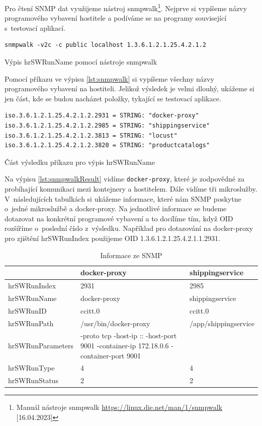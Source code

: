 Pro čtení SNMP dat využijeme nástroj snmpwalk\footnote{Manuál nástroje snmpwalk \url{https://linux.die.net/man/1/snmpwalk} [16.04.2023]}. Nejprve si vypíšeme názvy programového vybavení hostitele a podíváme se na programy související s~testovací aplikací.

\begin{listing}[H]
    \begin{verbatim}
snmpwalk -v2c -c public localhost 1.3.6.1.2.1.25.4.2.1.2
\end{verbatim}
    \caption{Výpis hrSWRunName pomocí nástroje snmpwalk}
    \label{lst:snmpwalk}
\end{listing}

Pomocí příkazu ve výpisu \ref{lst:snmpwalk} si vypíšeme všechny názvy programového vybavení na hostiteli. Jelikož výsledek je velmi dlouhý, ukážeme si jen část, kde se budou nacházet položky, tykající se testovací aplikace.

\begin{listing}[H]
    \begin{verbatim}
iso.3.6.1.2.1.25.4.2.1.2.2931 = STRING: "docker-proxy"
iso.3.6.1.2.1.25.4.2.1.2.2985 = STRING: "shippingservice"
iso.3.6.1.2.1.25.4.2.1.2.3813 = STRING: "locust"
iso.3.6.1.2.1.25.4.2.1.2.3820 = STRING: "productcatalogs"
\end{verbatim}
    \caption{Část výsledku příkazu pro výpis hrSWRunName}
    \label{lst:snmpwalkResult}
\end{listing}

Na výpisu \ref{lst:snmpwalkResult} vidíme \texttt{docker-proxy}, které je zodpovědné za probíhající komunikaci mezi kontejnery a hostitelem. Dále vidíme tři mikroslužby. V~následujících tabulkách si ukážeme informace, které nám SNMP poskytne o~jedné mikroslužbě a docker-proxy. Na jednotlivé informace se budeme dotazovat na konkrétní programové vybavení a to docílíme tím, když OID rozšíříme o~poslední číslo z~výsledku. Například pro dotazování na docker-proxy pro zjištění hrSWRunIndex použijeme OID 1.3.6.1.2.1.25.4.2.1.1.2931.


\begin{table}[H]
\centering
\begin{tabular}{|p{3.5cm}|p{6cm}|p{3.8cm}|}
\hline
 & \textbf{docker-proxy} & \textbf{shippingservice} \\ \hline
hrSWRunIndex & 2931 & 2985 \\ \hline
hrSWRunName & docker-proxy & shippingservice \\ \hline
hrSWRunID & ccitt.0 & ccitt.0\\ \hline
hrSWRunPath & /usr/bin/docker-proxy & /app/shippingservice\\ \hline
hrSWRunParameters & -proto tcp -host-ip :: -host-port 9001 -container-ip 172.18.0.6 -container-port 9001 & \\ \hline
hrSWRunType & 4 & 4 \\ \hline
hrSWRunStatus & 2 & 2\\ \hline
\end{tabular}
\caption{Informace ze SNMP}
\label{tbl:info}
\end{table}

